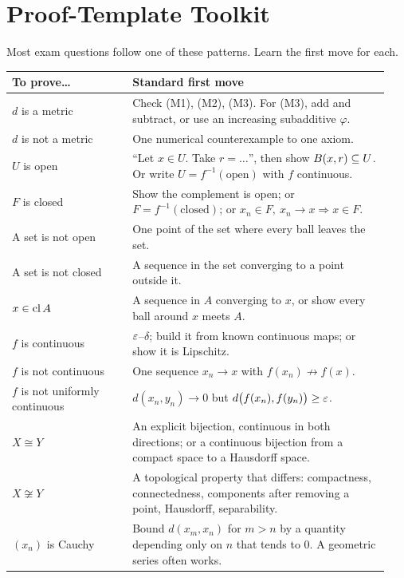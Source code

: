 \chapter{Proof-Template Toolkit}\label{app:toolkit}
Most exam questions follow one of these patterns. Learn the first move for each.
\begin{center}
\renewcommand{\arraystretch}{1.3}
\begin{longtable}{@{}p{0.3\linewidth}p{0.64\linewidth}@{}}
\toprule
\textbf{To prove\dots} & \textbf{Standard first move}\\
\midrule
\endhead
$d$ is a metric & Check \textup{(M1)}, \textup{(M2)}, \textup{(M3)}. For \textup{(M3)}, add and subtract, or use an increasing subadditive $\varphi$.\\
$d$ is not a metric & One numerical counterexample to one axiom.\\
$U$ is open & ``Let $x\in U$. Take $r=\dots$'', then show $B(x,r)\subseteq U$. Or write $U=f^{-1}(\text{open})$ with $f$ continuous.\\
$F$ is closed & Show the complement is open; or $F=f^{-1}(\text{closed})$; or $x_n\in F,\ x_n\to x\Rightarrow x\in F$.\\
A set is not open & One point of the set where every ball leaves the set.\\
A set is not closed & A sequence in the set converging to a point outside it.\\
$x\in\operatorname{cl} A$ & A sequence in $A$ converging to $x$, or show every ball around $x$ meets $A$.\\
$f$ is continuous & $\varepsilon$--$\delta$; build it from known continuous maps; or show it is Lipschitz.\\
$f$ is not continuous & One sequence $x_n\to x$ with $f(x_n)\not\to f(x)$.\\
$f$ is not uniformly continuous & $d(x_n,y_n)\to0$ but $d\bigl(f(x_n),f(y_n)\bigr)\ge\varepsilon$.\\
$X\cong Y$ & An explicit bijection, continuous in both directions; or a continuous bijection from a compact space to a Hausdorff space.\\
$X\not\cong Y$ & A topological property that differs: compactness, connectedness, components after removing a point, Hausdorff, separability.\\
$(x_n)$ is Cauchy & Bound $d(x_m,x_n)$ for $m>n$ by a quantity depending only on $n$ that tends to $0$. A geometric series often works.\\

\end{longtable}
\end{center}
